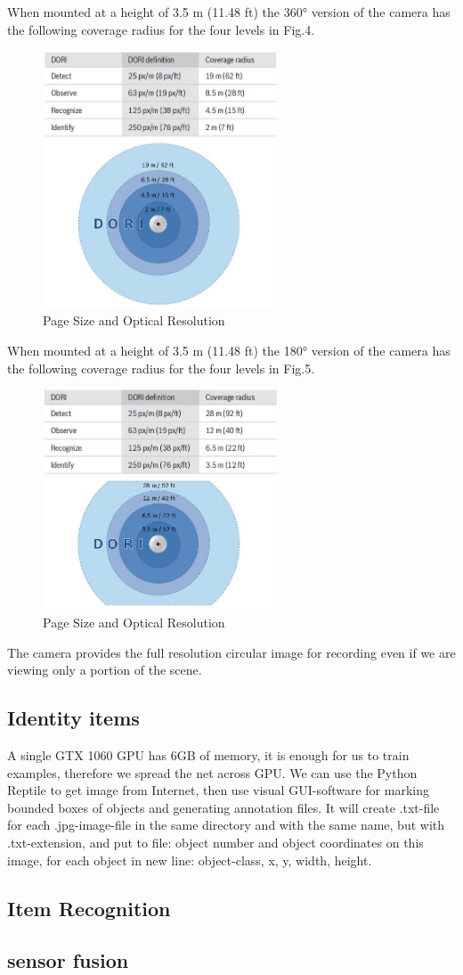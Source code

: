 When mounted at a height of 3.5 m (11.48 ft) the 360° version of the camera has the following coverage radius for the four levels in Fig.4.
\begin{figure}[htbp]
\centerline{\includegraphics[width=7cm,scale=0.8]{camera360.jpg}}
\caption{Page Size and Optical Resolution}
\label{fig}
\end{figure}

When mounted at a height of 3.5 m (11.48 ft) the 180° version of the camera has the following coverage radius for the four levels in Fig.5.
\begin{figure}[htbp]
\centerline{\includegraphics[width=7cm,scale=0.8]{camera180.jpg}}
\caption{Page Size and Optical Resolution}
\label{fig}
\end{figure}
The camera provides the full resolution circular image for recording even if we are viewing only a portion of the scene.

\subsection{Identity items}

A single GTX 1060 GPU has 6GB of memory, it is enough for us to train examples, therefore we spread the net across GPU. 
We can use the Python Reptile to get image from Internet, then use visual GUI-software for marking bounded boxes of objects and generating annotation files. 
It will create .txt-file for each .jpg-image-file in the same directory and with the same name, but with .txt-extension, and put to file: object number and object coordinates on this image, for each object in new line: object-class, x, y, width, height.

\subsection{Item Recognition}

\subsection{sensor fusion}
